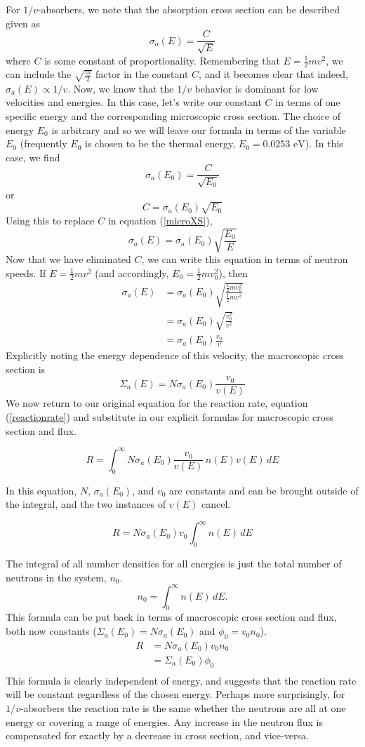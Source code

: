 \documentclass{report}
\begin{document}
For $1/v$-absorbers, we note that the absorption cross section can be described given as
\begin{equation}
\label{microXS}
\sigma_a(E) = \frac{C}{\sqrt{E}}
\end{equation}
where $C$ is some constant of proportionality. Remembering that $E = \frac{1}{2}mv^2$, we can include the $\sqrt{\frac{m}{2}}$ factor in the constant $C$, and it becomes clear that indeed, $\sigma_a(E) \propto 1/v$. Now, we know that the $1/v$ behavior is dominant for low velocities and energies. In this case, let's write our constant $C$ in terms of one specific energy and the corresponding microscopic cross section. The choice of energy $E_0$ is arbitrary and so we will leave our formula in terms of the variable $E_0$ (frequently $E_0$ is chosen to be the thermal energy, $E_0 = 0.0253\text{ eV}$). In this case, we find
$$ \sigma_a(E_0) = \frac{C}{\sqrt{E_0}} $$
or
$$ C = \sigma_a(E_0)\sqrt{E_0} $$
Using this to replace $C$ in equation (\ref{microXS}), 
$$ \sigma_a(E) = \sigma_a(E_0)\sqrt{\frac{E_0}{E}} $$
Now that we have eliminated $C$, we can write this equation in terms of neutron speeds. If $E = \frac{1}{2}mv^2$ (and accordingly, $E_0 = \frac{1}{2}mv_0^2$), then
\begin{align*}
\sigma_a(E)	&= \sigma_a(E_0)\sqrt{\frac{\frac{1}{2}mv_0^2}{\frac{1}{2}mv^2}} \\
			&= \sigma_a(E_0)\sqrt{\frac{v_0^2}{v^2}} \\
			&= \sigma_a(E_0)\frac{v_0}{v}
\end{align*}
Explicitly noting the energy dependence of this velocity, the macroscopic cross section is
$$ \Sigma_a(E) = N \sigma_a(E_0)\frac{v_0}{v(E)} $$
We now return to our original equation for the reaction rate, equation (\ref{reactionrate}) and substitute in our explicit formulas for macroscopic cross section and flux.

$$ R = \int_0^{\infty} N \sigma_a(E_0)\frac{v_0}{v(E)} \, n(E) v(E) \, dE $$

In this equation, $N$, $\sigma_a(E_0)$, and $v_0$ are constants and can be brought outside of the integral, and the two instances of $v(E)$ cancel.

$$ R = N \sigma_a(E_0) v_0 \int_0^{\infty} n(E) \, dE $$

The integral of all number densities for all energies is just the total number of neutrons in the system, $n_0$. 
$$ n_0 = \int_0^{\infty} n(E) \, dE .$$
This formula can be put back in terms of macroscopic cross section and flux, both now constants ($\Sigma_a(E_0) = N \sigma_a(E_0)$ and $\phi_0 = v_0 n_0$).
\begin{align*}
R	&= N \sigma_a(E_0) v_0 n_0 \\
	&= \Sigma_a(E_0) \phi_0 \\
\end{align*}
This formula is clearly independent of energy, and suggests that the reaction rate will be constant regardless of the chosen energy. Perhaps more surprisingly, for $1/v$-absorbers the reaction rate is the same whether the neutrons are all at one energy or covering a range of energies. Any increase in the neutron flux is compensated for exactly by a decrease in cross section, and vice-versa.
\end{document}
